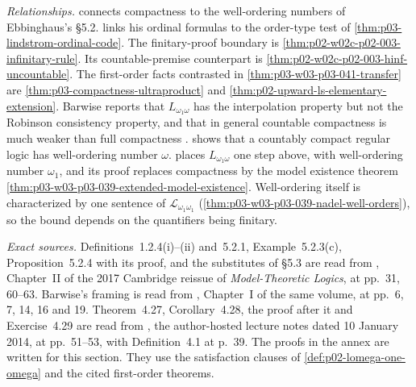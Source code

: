 \emph{Relationships.} 
connects compactness to the well-ordering numbers of Ebbinghaus's \S5.2.
 links his ordinal formulas to the order-type
test of \cref{thm:p03-lindstrom-ordinal-code}. The finitary-proof
boundary is \cref{thm:p02-w02c-p02-003-infinitary-rule}. Its
countable-premise counterpart is
\cref{thm:p02-w02c-p02-003-hinf-uncountable}. The first-order facts
contrasted in \cref{thm:p03-w03-p03-041-transfer} are
\cref{thm:p03-compactness-ultraproduct} and
\cref{thm:p02-upward-ls-elementary-extension}. Barwise reports that \(L_{\omega_1\omega}\)
has the interpolation property but not the Robinson consistency property,
and that in general countable compactness is much weaker than full
compactness \cite[Ch.~I, \S2.3, p.~16]{Barwise1985BackgroundAims}.
 shows that a countably compact
regular logic has well-ordering number \(\omega\).
 places \(L_{\omega_1\omega}\) one
step above, with well-ordering number \(\omega_1\), and its proof replaces
compactness by the model existence theorem
\cref{thm:p03-w03-p03-039-extended-model-existence}. Well-ordering itself
is characterized by one sentence of \(\mathscr L_{\omega_1\omega_1}\)
(\cref{thm:p03-w03-p03-039-nadel-well-orders}), so the bound depends on
the quantifiers being finitary.

\emph{Exact sources.} Definitions~1.2.4(i)--(ii) and~5.2.1,
Example~5.2.3(c), Proposition~5.2.4 with its proof, and the substitutes of
\S5.3 are read from \textcite{Ebbinghaus1985ExtendedLogics}, Chapter~II
of the 2017 Cambridge reissue of \emph{Model-Theoretic Logics}, at
pp.~31, 60--63. Barwise's framing is read from
\textcite{Barwise1985BackgroundAims}, Chapter~I of the same volume, at
pp.~6, 7, 14, 16 and 19. Theorem~4.27, Corollary~4.28, the proof
after it and Exercise~4.29 are read from
\textcite{Marker2014InfinitaryNotes}, the author-hosted lecture notes
dated 10 January 2014, at pp.~51--53, with Definition~4.1 at p.~39. The
proofs in the annex are written for this
section. They use the satisfaction clauses of
\cref{def:p02-lomega-one-omega} and the cited first-order theorems.
